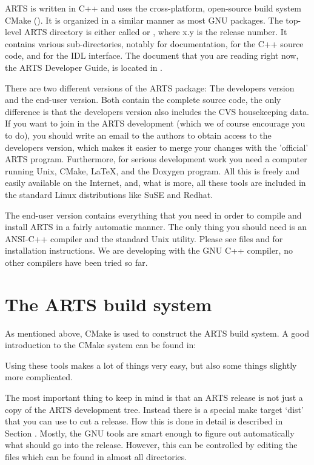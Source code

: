 ARTS is written in C++ and uses the cross-platform, open-source build system
CMake (). It is organized in a similar
manner as most GNU packages. The top-level ARTS directory is either called
 or , where x.y is the release number. It
contains various sub-directories, notably  for documentation,
 for the C++ source code, and  for the IDL
interface. The document that you are reading right now, the ARTS Developer
Guide, is located in .

There are two different versions of the ARTS package: The developers
version and the end-user version. Both contain the complete source
code, the only difference is that the developers version also includes
the CVS housekeeping data. If you want to join in the ARTS development
(which we of course encourage you to do), you should write an email to
the authors to obtain access to the developers version, which makes it
easier to merge your changes with the 'official' ARTS program.
Furthermore, for serious development work you need a computer running
Unix, CMake, LaTeX, and the Doxygen program.  All
this is freely and easily available on the Internet, and, what is
more, all these tools are included in the standard Linux
distributions like SuSE and Redhat.

The end-user version contains everything that you need in order to
compile and install ARTS in a fairly automatic manner. The only
thing you should need is an ANSI-C++ compiler and the standard Unix
 utility. Please see files  and
 for installation instructions. We are developing
with the GNU C++ compiler, no other compilers have been tried so
far.

\section{The ARTS build system}

As mentioned above, CMake is used to construct the ARTS
build system. A good introduction to the CMake system can be found in:
\begin{quote}
  \footnotesize
\end{quote}
Using these tools makes a lot of things very easy, but also some
things slightly more complicated.

The most important thing to keep in mind is that an ARTS release
is not just a copy of the ARTS development tree. Instead there is a
special make target `dist' that you can use to cut a release. How this
is done in detail is described in Section . Mostly,
the GNU tools are smart enough to figure out automatically what should
go into the release. However, this can be controlled by editing the
 files which can be found in almost all directories.

